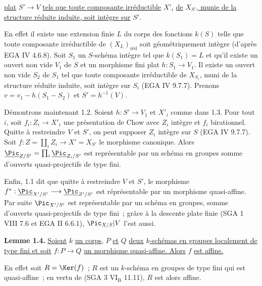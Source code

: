 
\uline{plat} \(S'\to V\) \uline{tels que toute composante irréductible} \(X'_i\) \uline{de} \(X_{S'}\)\uline{, munie de la structure réduite induite, soit intègre sur} \(S'\).

En effet il existe une extension finie \(L\) du corps des fonctions \(k(S)\) telle que toute composante irréductible de \((X_L)_{\text{réd}}\) soit géométriquement intègre (d'après EGA IV 4.6.8). Soit \(S_1\) un \(S\)-schéma intègre tel que \(k(S_1)=L\) et qu'il existe un ouvert non vide \(V_1\) de \(S\) et un morphisme fini plat \(h:S_1\to V_1\). Il existe un ouvert non vide \(S_2\) de \(S_1\) tel que toute composante irréductible de \(X_{S_i}\), muni de la structure réduite induite, soit intègre sur \(S_i\) (EGA IV 9.7.7). Prenons \(v=v_1-h(S_1-S_2)\) et \(S'=h^{-1}(V)\).

Démontrons maintenant 1.2. Soient \(h:S'\to V_1\) et \(X'_i\) comme dans 1.3. Pour tout \(i\), soit \(f_i:Z_i\to X'_i\) une présentation de Chow avec \(Z_i\) intègre et \(f_i\) birationnel. Quitte à restreindre \(V\) et \(S'\), on peut supposer \(Z_i\) intègre sur \(S\) (EGA IV 9.7.7). Soit \(f:Z=\coprod_i Z_i\longrightarrow X'=X_{S'}\) le morphisme canonique. Alors \(\underline{\Pic}_{Z/S'}=\prod_i\underline{\Pic}_{Z_i/S'}\) est représentable par un schéma en groupes somme d'ouverts quasi-projectifs de type fini.

Enfin, 1.1 dit que quitte à restreindre \(V\) et \(S'\), le morphisme \(f^*:\underline{\Pic}_{X'/S'}\longrightarrow \underline{\Pic}_{Z'/S'}\) est réprésentable par un morphisme quasi-affine. Par suite \(\Pic_{X'/S'}\) est représentable par un schéma en groupes, somme d'ouverts quasi-projectifs de type fini~; grâce à la descente plate finie (SGA 1 VIII 7.6 et EGA II 6.6.1), \(\Pic_{X/S}|V\) l'est aussi.

\textbf{Lemme 1.4.} \uline{Soient} \(k\) \uline{un corps,} \(P\) \uline{et} \(Q\) \uline{deux} \(k\)\uline{-schémas en groupes localement de type fini et soit} \(f:P\to Q\) \uline{un morphisme quasi-affine. Alors} \(f\) \uline{est affine.}

En effet soit \(R=\Ker(f)\)~; \(R\) est un \(k\)-schéma en groupes de type fini qui est quasi-affine~; en vertu de (SGA 3 \(\mathrm{VI}_{\mathrm B}\) 11.11), \(R\) est alors affine.
